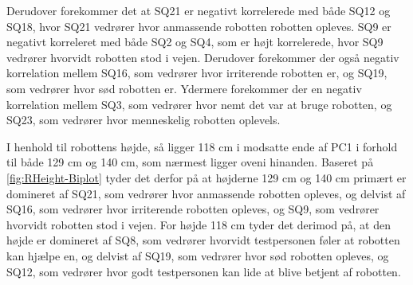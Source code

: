 Derudover forekommer det at SQ21 er negativt korrelerede med både SQ12 og SQ18, hvor SQ21 vedrører hvor anmassende robotten robotten opleves. SQ9 er negativt korreleret med både SQ2 og SQ4, som er højt korrelerede, hvor SQ9 vedrører hvorvidt robotten stod i vejen. Derudover forekommer der også negativ korrelation mellem SQ16, som vedrører hvor irriterende robotten er, og SQ19, som vedrører hvor sød robotten er. Ydermere forekommer der en negativ korrelation mellem SQ3, som vedrører hvor nemt det var at bruge robotten, og SQ23, som vedrører hvor menneskelig robotten oplevels.  

I henhold til robottens højde, så ligger 118 cm i modsatte ende af PC1 i forhold til både 129 cm og 140 cm, som nærmest ligger oveni hinanden. Baseret på \autoref{fig:RHeight-Biplot} tyder det derfor på at højderne 129 cm og 140 cm primært er domineret af SQ21, som vedrører hvor anmassende robotten opleves, og delvist af SQ16, som vedrører hvor irriterende robotten opleves, og SQ9, som vedrører hvorvidt robotten stod i vejen. For højde 118 cm tyder det derimod på, at den højde er domineret af SQ8, som vedrører hvorvidt testpersonen føler at robotten kan hjælpe en, og delvist af SQ19, som vedrører hvor sød robotten opleves, og SQ12, som vedrører hvor godt testpersonen kan lide at blive betjent af robotten. 

